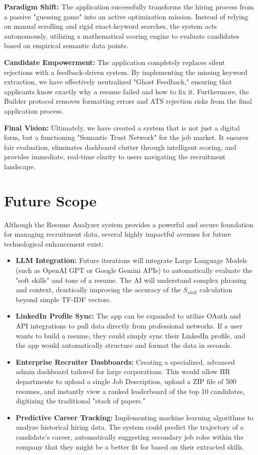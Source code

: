 \documentclass[12pt,a4paper]{report}
\begin{document}
\textbf{Paradigm Shift:} The application successfully transforms the hiring process from a passive "guessing game" into an active optimization mission. Instead of relying on manual scrolling and rigid exact-keyword searches, the system acts autonomously, utilizing a mathematical scoring engine to evaluate candidates based on empirical semantic data points.

\textbf{Candidate Empowerment:} The application completely replaces silent rejections with a feedback-driven system. By implementing the missing keyword extraction, we have effectively neutralized "Ghost Feedback," ensuring that applicants know exactly why a resume failed and how to fix it. Furthermore, the Builder protocol removes formatting errors and ATS rejection risks from the final application process.

\textbf{Final Vision:} Ultimately, we have created a system that is not just a digital form, but a functioning "Semantic Trust Network" for the job market. It ensures fair evaluation, eliminates dashboard clutter through intelligent scoring, and provides immediate, real-time clarity to users navigating the recruitment landscape.

\section{Future Scope}

Although the Resume Analyzer system provides a powerful and secure foundation for managing recruitment data, several highly impactful avenues for future technological enhancement exist:

\begin{itemize}
    \item \textbf{LLM Integration:} Future iterations will integrate Large Language Models (such as OpenAI GPT or Google Gemini APIs) to automatically evaluate the "soft skills" and tone of a resume. The AI will understand complex phrasing and context, drastically improving the accuracy of the $S_{skill}$ calculation beyond simple TF-IDF vectors.
    \item \textbf{LinkedIn Profile Sync:} The app can be expanded to utilize OAuth and API integrations to pull data directly from professional networks. If a user wants to build a resume, they could simply sync their LinkedIn profile, and the app would automatically structure and format the data in seconds.
    \item \textbf{Enterprise Recruiter Dashboards:} Creating a specialized, advanced admin dashboard tailored for large corporations. This would allow HR departments to upload a single Job Description, upload a ZIP file of 500 resumes, and instantly view a ranked leaderboard of the top 10 candidates, digitizing the traditional "stack of papers."
    \item \textbf{Predictive Career Tracking:} Implementing machine learning algorithms to analyze historical hiring data. The system could predict the trajectory of a candidate's career, automatically suggesting secondary job roles within the company that they might be a better fit for based on their extracted skills.
\end{itemize}
\end{document}

